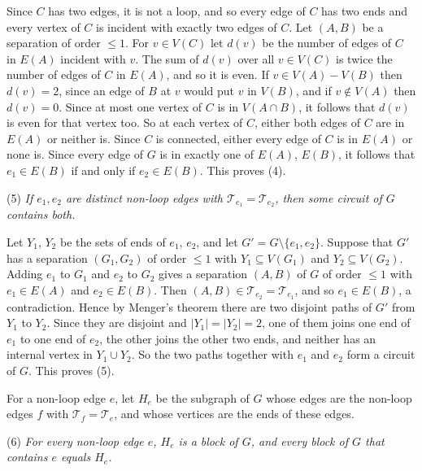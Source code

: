 {Since $C$ has two edges, it is not a loop, and so every edge of $C$ has two ends and every vertex of $C$ is incident with exactly two edges of $C$. Let $(A, B)$ be a separation of order $\le 1$. For $v \in V(C)$ let $d(v)$ be the number of edges of $C$ in $E(A)$ incident with $v$. The sum of $d(v)$ over all $v \in V(C)$ is twice the number of edges of $C$ in $E(A)$, and so it is even. If $v \in V(A) - V(B)$ then $d(v) = 2$, since an edge of $B$ at $v$ would put $v$ in $V(B)$, and if $v \notin V(A)$ then $d(v) = 0$. Since at most one vertex of $C$ is in $V(A \cap B)$, it follows that $d(v)$ is even for that vertex too. So at each vertex of $C$, either both edges of $C$ are in $E(A)$ or neither is. Since $C$ is connected, either every edge of $C$ is in $E(A)$ or none is. Since every edge of $G$ is in exactly one of $E(A)$, $E(B)$, it follows that $e_1 \in E(B)$ if and only if $e_2 \in E(B)$. This proves (4).

\hspace*{12pt}(5) \textit{If $e_1, e_2$ are distinct non-loop edges with $\mathscr{T}_{e_1} = \mathscr{T}_{e_2}$, then some circuit of $G$ contains both.}

Let $Y_1$, $Y_2$ be the sets of ends of $e_1$, $e_2$, and let $G' = G \setminus \{e_1, e_2\}$. Suppose that $G'$ has a separation $(G_1, G_2)$ of order $\le 1$ with $Y_1 \subseteq V(G_1)$ and $Y_2 \subseteq V(G_2)$. Adding $e_1$ to $G_1$ and $e_2$ to $G_2$ gives a separation $(A, B)$ of $G$ of order $\le 1$ with $e_1 \in E(A)$ and $e_2 \in E(B)$. Then $(A, B) \in \mathscr{T}_{e_2} = \mathscr{T}_{e_1}$, and so $e_1 \in E(B)$, a contradiction. Hence by Menger's theorem there are two disjoint paths of $G'$ from $Y_1$ to $Y_2$. Since they are disjoint and $|Y_1| = |Y_2| = 2$, one of them joins one end of $e_1$ to one end of $e_2$, the other joins the other two ends, and neither has an internal vertex in $Y_1 \cup Y_2$. So the two paths together with $e_1$ and $e_2$ form a circuit of $G$. This proves (5).

For a non-loop edge $e$, let $H_e$ be the subgraph of $G$ whose edges are the non-loop edges $f$ with $\mathscr{T}_f = \mathscr{T}_e$, and whose vertices are the ends of these edges.

\hspace*{12pt}(6) \textit{For every non-loop edge $e$, $H_e$ is a block of $G$, and every block of $G$ that contains $e$ equals $H_e$.}

}
